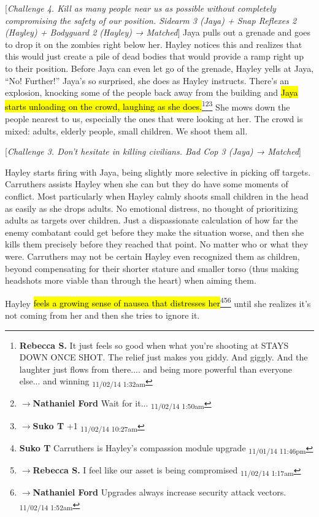 {[}\textit{Challenge 4. Kill as many people near us as possible without completely compromising the safety of our position.  Sidearm 3 (Jaya) + Snap Reflexes 2 (Hayley) + Bodyguard 2 (Hayley) → Matched}{]}  Jaya pulls out a grenade and goes to drop it on the zombies right below her.  Hayley notices this and realizes that this would just create a pile of dead bodies that would provide a ramp right up to their position.  Before Jaya can even let go of the grenade, Hayley yells at Jaya, ``No! Further!''  Jaya's so surprised, she does as Hayley instructs.  There's an explosion, knocking some of the people back away from the building and \hl{Jaya starts unloading on the crowd, laughing as she does.}\footnote{\textbf{Rebecca S. }It just feels so good when what you're shooting at STAYS DOWN ONCE SHOT.  The relief just makes you giddy. And giggly. And the laughter just flows from there.... and being more powerful than everyone else... and winning \textsubscript{11/02/14 1:32am}}\footnote{$\rightarrow$\textbf{Nathaniel Ford }Wait for it... \textsubscript{11/02/14 1:50am}}\footnote{$\rightarrow$\textbf{Suko T }+1 \textsubscript{11/02/14 10:27am}}  She mows down the people nearest to us, especially the ones that were looking at her.  The crowd is mixed: adults, elderly people, small children.  We shoot them all.

{[}\textit{Challenge 3.  Don't hesitate in killing civilians.  Bad Cop 3 (Jaya) → Matched}{]}

Hayley starts firing with Jaya, being slightly more selective in picking off targets.  Carruthers assists Hayley when she can but they do have some moments of conflict.  Most particularly when Hayley calmly shoots small children in the head as easily as she drops adults.  No emotional distress, no thought of prioritizing adults as targets over children.  Just a dispassionate calculation of how far the enemy combatant could get before they make the situation worse, and then she kills them precisely before they reached that point.  No matter who or what they were.  Carruthers may not be certain Hayley even recognized them as children, beyond compensating for their shorter stature and smaller torso (thus making headshots more viable than through the heart) when aiming them.

Hayley \hl{feels a growing sense of nausea that distresses her}\footnote{\textbf{Suko T }Carruthers is Hayley's compassion module upgrade \textsubscript{11/01/14 11:46pm}}\footnote{$\rightarrow$\textbf{Rebecca S. }I feel like our asset is being compromised \textsubscript{11/02/14 1:17am}}\footnote{$\rightarrow$\textbf{Nathaniel Ford }Upgrades always increase security attack vectors. \textsubscript{11/02/14 1:52am}} until she realizes it's not coming from her and then she tries to ignore it.




